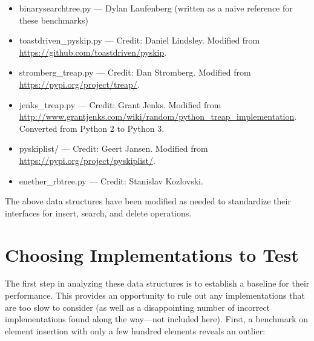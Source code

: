 \documentclass{article}
\begin{document}
\begin{itemize}
    \item binarysearchtree.py --- Dylan Laufenberg (written as a naive reference for these benchmarks)
    \item toastdriven\_pyskip.py --- Credit: Daniel Lindsley. Modified from \url{https://github.com/toastdriven/pyskip}.
    \item stromberg\_treap.py --- Credit: Dan Stromberg. Modified from \url{https://pypi.org/project/treap/}.
    \item jenks\_treap.py --- Credit: Grant Jenks. Modified from \url{http://www.grantjenks.com/wiki/random/python_treap_implementation}. Converted from Python 2 to Python 3.
    \item pyskiplist/ --- Credit: Geert Jansen. Modified from \url{https://pypi.org/project/pyskiplist/}.
    \item enether\_rbtree.py --- Credit: Stanislav Kozlovski. 
\end{itemize}

The above data structures have been modified as needed to standardize their interfaces for insert, search, and delete operations.

\section{Choosing Implementations to Test}
The first step in analyzing these data structures is to establish a baseline for their performance. This provides an opportunity to rule out any implementations that are too slow to consider (as well as a disappointing number of incorrect implementations found along the way---not included here). First, a benchmark on element insertion with only a few hundred elements reveals an outlier:
\end{document}
